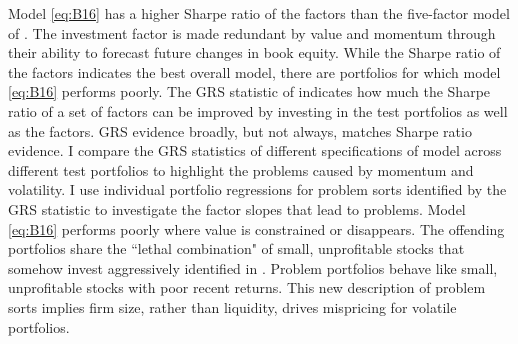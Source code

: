 Model \ref{eq:B16} has a higher Sharpe ratio of the factors than the
five-factor model of \textcite{fama2016dissecting}.
The investment factor is made redundant by value and momentum
through their ability to forecast future changes in book equity.
While the Sharpe ratio of the factors indicates the best overall model,
there are portfolios for which model \ref{eq:B16} performs poorly.
The GRS statistic of \textcite{gibbons1989test} indicates how much the Sharpe
ratio of a set of factors can be improved by investing in the test portfolios
as well as the factors.
GRS evidence broadly, but not always, matches Sharpe ratio evidence.
I compare the GRS statistics of different specifications of model across
different test portfolios to highlight the problems caused by momentum and
volatility.
I use individual portfolio regressions for problem sorts identified by the GRS
statistic to investigate the factor slopes that lead to problems.
Model \ref{eq:B16} performs poorly where value is constrained or disappears.
The offending portfolios share the ``lethal combination" of small, unprofitable
stocks that somehow invest aggressively identified in
\textcite{fama2015five, fama2016dissecting}.
Problem portfolios behave like small, unprofitable stocks with poor recent returns.
This new description of problem sorts implies firm size, rather than liquidity,
drives mispricing for volatile portfolios.
